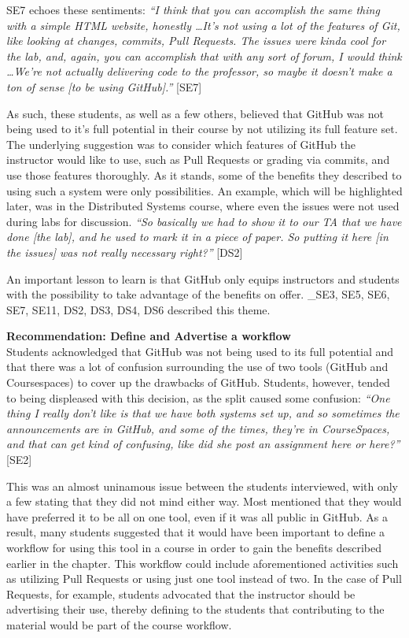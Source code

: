 SE7 echoes these sentiments: \textit{``I think that you can accomplish the same thing with a simple HTML website, honestly \ldots It's not using a lot of the features of Git, like looking at changes, commits, Pull Requests. The issues were kinda cool for the lab, and, again, you can accomplish that with any sort of forum, I would think \ldots We're not actually delivering code to the professor, so maybe it doesn't make a ton of sense [to be using GitHub].''} [SE7]

As such, these students, as well as a few others, believed that GitHub was not being used to it's full potential in their course by not utilizing its full feature set. The underlying suggestion was to consider which features of GitHub the instructor would like to use, such as Pull Requests or grading via commits, and use those features thoroughly. As it stands, some of the benefits they described to using such a system were only possibilities. An example, which will be highlighted later, was in the Distributed Systems course, where even the issues were not used during labs for discussion. \textit{``So basically we had to show it to our TA that we have done [the lab], and he used to mark it in a piece of paper. So putting it here [in the issues] was not really necessary right?''} [DS2]

An important lesson to learn is that GitHub only equips instructors and students with the possibility to take advantage of the benefits on offer. _{SE3, SE5, SE6, SE7, SE11, DS2, DS3, DS4, DS6} described this theme.

\textbf{Recommendation: Define and Advertise a workflow} \\
Students acknowledged that GitHub was not being used to its full potential and that there was a lot of confusion surrounding the use of two tools (GitHub and Coursespaces) to cover up the drawbacks of GitHub. Students, however, tended to being displeased with this decision, as the split caused some confusion: \textit{``One thing I really don't like is that we have both systems set up, and so sometimes the announcements are in GitHub, and some of the times, they're in CourseSpaces, and that can get kind of confusing, like did she post an assignment here or here?''} [SE2]

This was an almost uninamous issue between the students interviewed, with only a few stating that they did not mind either way. Most mentioned that they would have preferred it to be all on one tool, even if it was all public in GitHub. As a result, many students suggested that it would have been important to define a workflow for using this tool in a course in order to gain the benefits described earlier in the chapter. This workflow could include aforementioned activities such as utilizing Pull Requests or using just one tool instead of two. In the case of Pull Requests, for example, students advocated that the instructor should be advertising their use, thereby defining to the students that contributing to the material would be part of the course workflow.

